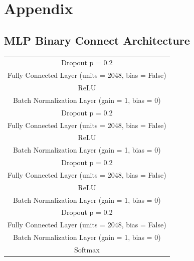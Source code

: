 \newpage
\section*{Appendix}
\subsection*{MLP Binary Connect Architecture}
\begin{table}[H]
\begin{center}
\begin{tabular}{  c  }
\hline
   Dropout p = 0.2 \\ 
   Fully Connected Layer (units = 2048, bias = False) \\
   ReLU \\
   Batch Normalization Layer (gain = 1, bias = 0)  \\ \hline
   Dropout p = 0.2 \\ 
   Fully Connected Layer (units = 2048, bias = False)  \\
   ReLU  \\
   Batch Normalization Layer (gain = 1, bias = 0) \\ \hline
   Dropout p = 0.2 \\ 
   Fully Connected Layer (units = 2048, bias = False) \\
   ReLU  \\
   Batch Normalization Layer (gain = 1, bias = 0) \\ \hline
   Dropout p = 0.2 \\ 
   Fully Connected Layer (units = 2048, bias = False)  \\
   Batch Normalization Layer (gain = 1, bias = 0)  \\ 
   Softmax  \\\hline
\end{tabular}
\end{center}
\end{table}

